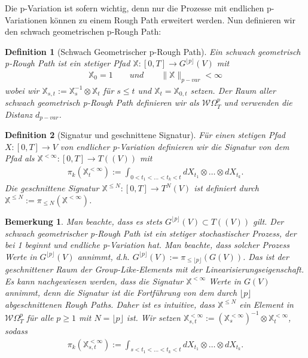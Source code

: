\documentclass[12pt,titlepage,headsepline]{article}
\newtheorem{definition}{Definition}[section]
\newtheorem*{bemerkung*}{Bemerkung}
\begin{document}
      \hfill\break
      Die p-Variation ist sofern wichtig, denn nur die Prozesse mit endlichen p-Variationen können zu einem Rough Path erweitert werden.\cite{lyons_extension_2007}
      \hfill\break
      Nun definieren wir den schwach geometrischen p-Rough Path:
      \begin{definition}[Schwach Geometrischer p-Rough Path]
        Ein schwach geometrisch p-Rough Path ist ein stetiger Pfad $\mathbb{X}: [0,T] \rightarrow G^{\lfloor p\rfloor}(V)$ mit
        \begin{align*}
          \mathbb{X}_0 = 1
          \qquad und \qquad
          \lVert \mathbb{X} \rVert_{p-var} < \infty
        \end{align*}
        wobei wir $\mathbb{X}_{s,t}:= \mathbb{X}^{-1}_s \otimes \mathbb{X}_t$ für $s \leq t $ und $\mathbb{X}_t=\mathbb{X}_{0,t}$ setzen.
        Der Raum aller schwach geometrisch p-Rough Path definieren wir als $\mathcal{W}\Omega^p_T$ und verwenden die Distanz $d_{p-var}$.
      \end{definition}
      \begin{definition}[Signatur und geschnittene Signatur]
        Für einen stetigen Pfad $X: [0,T] \rightarrow V$ von endlicher p-Variation definieren wir die Signatur von dem Pfad als $\mathbb{X}^{<\infty}:[0,T] \rightarrow T((V))$ mit
        \begin{align*}
          \pi_k(\mathbb{X}^{<\infty}_t):=\int_{0<t_1<\ldots<t_k<t} dX_{t_1}\otimes \ldots \otimes dX_{t_k}.
        \end{align*}
        Die geschnittene Signatur $\mathbb{X}^{\leq N}:[0,T] \rightarrow T^N(V)$ ist definiert durch $\mathbb{X}^{\leq N}:=\pi_{\leq N}(\mathbb{X}^{<\infty})$.
      \end{definition}
      \begin{bemerkung*}
        \textup{
        Man beachte, dass es stets $ G^{\lfloor p\rfloor}(V) \subset T((V))$ gilt. Der schwach geometrischer p-Rough Path ist ein stetiger stochastischer Prozess, der bei 1 beginnt und endliche p-Variation hat. Man beachte, dass solcher Prozess Werte in $G^{\lfloor p\rfloor}(V)$ annimmt, d.h. $G^{\lfloor p\rfloor}(V):=\pi_{\leq {\lfloor p\rfloor}}(G(V))$. Das ist der geschnittener Raum der Group-Like-Elements mit der Linearisierungseigenschaft. Es kann nachgewiesen werden, dass die Signatur $\mathbb{X}^{<\infty}$ Werte in $G(V)$ annimmt, denn die Signatur ist die Fortführung von dem durch $\lfloor p\rfloor$ abgeschnittenen Rough Paths. Daher ist es intuitive, dass $\mathbb{X}^{\leq N}$ ein Element in
        $\mathcal{W}\Omega^p_T$ für alle $p \geq 1$ mit $N=\lfloor p \rfloor$ ist.
        Wir setzen $\mathbb{X}^{<\infty}_{s,t}:=(\mathbb{X}^{<\infty}_s)^{-1}\otimes \mathbb{X}^{<\infty}_t$,
        sodass
        \begin{align*}
          \pi_k(\mathbb{X}^{<\infty}_{s,t}):=\int_{s<t_1<\ldots<t_k<t} dX_{t_1}\otimes \ldots \otimes dX_{t_k}.
        \end{align*}
        }
      \end{bemerkung*}
\end{document}
